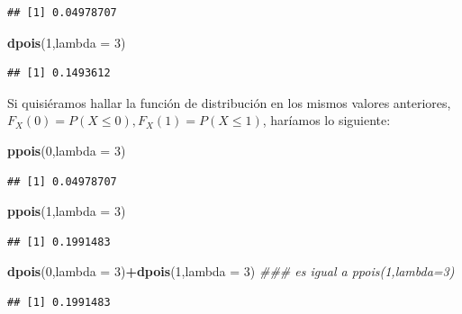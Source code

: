 \documentclass[]{book}
\newenvironment{Shaded}{\begin{snugshade}}{\end{snugshade}}
\newcommand{\CommentTok}[1]{\textcolor[rgb]{0.56,0.35,0.01}{\textit{#1}}}
\newcommand{\DataTypeTok}[1]{\textcolor[rgb]{0.13,0.29,0.53}{#1}}
\newcommand{\DecValTok}[1]{\textcolor[rgb]{0.00,0.00,0.81}{#1}}
\newcommand{\KeywordTok}[1]{\textcolor[rgb]{0.13,0.29,0.53}{\textbf{#1}}}
\newcommand{\NormalTok}[1]{#1}
\newcommand{\OperatorTok}[1]{\textcolor[rgb]{0.81,0.36,0.00}{\textbf{#1}}}
\begin{document}
\begin{verbatim}
## [1] 0.04978707
\end{verbatim}

\begin{Shaded}
\begin{Highlighting}[]
\KeywordTok{dpois}\NormalTok{(}\DecValTok{1}\NormalTok{,}\DataTypeTok{lambda =} \DecValTok{3}\NormalTok{)}
\end{Highlighting}
\end{Shaded}

\begin{verbatim}
## [1] 0.1493612
\end{verbatim}

Si quisiéramos hallar la función de distribución en los mismos valores anteriores,
\(F_X(0)=P(X\leq 0), F_X(1)=P(X\leq 1)\), haríamos lo siguiente:

\begin{Shaded}
\begin{Highlighting}[]
\KeywordTok{ppois}\NormalTok{(}\DecValTok{0}\NormalTok{,}\DataTypeTok{lambda =} \DecValTok{3}\NormalTok{)}
\end{Highlighting}
\end{Shaded}

\begin{verbatim}
## [1] 0.04978707
\end{verbatim}

\begin{Shaded}
\begin{Highlighting}[]
\KeywordTok{ppois}\NormalTok{(}\DecValTok{1}\NormalTok{,}\DataTypeTok{lambda =} \DecValTok{3}\NormalTok{)}
\end{Highlighting}
\end{Shaded}

\begin{verbatim}
## [1] 0.1991483
\end{verbatim}

\begin{Shaded}
\begin{Highlighting}[]
\KeywordTok{dpois}\NormalTok{(}\DecValTok{0}\NormalTok{,}\DataTypeTok{lambda =} \DecValTok{3}\NormalTok{)}\OperatorTok{+}\KeywordTok{dpois}\NormalTok{(}\DecValTok{1}\NormalTok{,}\DataTypeTok{lambda =} \DecValTok{3}\NormalTok{) }\CommentTok{### es igual a ppois(1,lambda=3)}
\end{Highlighting}
\end{Shaded}

\begin{verbatim}
## [1] 0.1991483
\end{verbatim}
\end{document}
